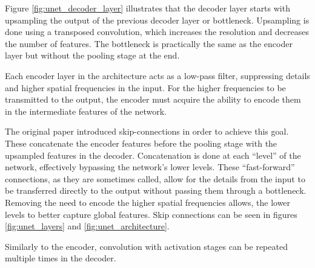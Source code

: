 Figure \ref{fig:unet_decoder_layer} illustrates that the decoder layer starts with upsampling the output of the previous decoder layer or bottleneck. Upsampling is done using a transposed convolution, which increases the resolution and decreases the number of features. The bottleneck is practically the same as the encoder layer but without the pooling stage at the end.

Each encoder layer in the architecture acts as a low-pass filter, suppressing details and higher spatial frequencies in the input. For the higher frequencies to be transmitted to the output, the encoder must acquire the ability to encode them in the intermediate features of the network. \cite{gunet}

The original paper \cite{unet} introduced skip-connections in order to achieve this goal. These concatenate the encoder features before the pooling stage with the upsampled features in the decoder. Concatenation is done at each ``level'' of the network, effectively bypassing the network's lower levels. These ``fast-forward'' connections, as they are sometimes called, allow for the details from the input to be transferred directly to the output without passing them through a bottleneck. Removing the need to encode the higher spatial frequencies allows, the lower levels to better capture global features. Skip connections can be seen in figures \ref{fig:unet_layers} and \ref{fig:unet_architecture}.

Similarly to the encoder, convolution with activation stages can be repeated multiple times in the decoder.

